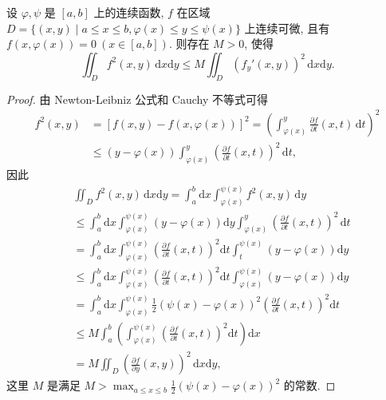 \documentclass[../../main.tex]{subfiles}%
\begin{document}
\begin{theorem}\label{theorem:Poincaré(庞加莱)不等式}
设 \(\varphi, \psi\) 是 \([a,b]\) 上的连续函数, \(f\) 在区域 \(D = \{(x,y) \mid a \leqslant x \leqslant b, \varphi(x) \leqslant y \leqslant \psi(x)\}\) 上连续可微, 且有 \(f(x, \varphi(x)) = 0\ (x \in [a,b])\). 则存在 \(M > 0\), 使得
\[
\iint_D f^2(x,y) \, \mathrm{d}x\mathrm{d}y \leqslant M \iint_D (f_y'(x,y))^2 \, \mathrm{d}x\mathrm{d}y.
\]
\end{theorem}
\begin{proof}

由 Newton-Leibniz 公式和 Cauchy 不等式可得
\begin{align*}
f^2(x,y)&=[f(x,y)-f(x,\varphi (x))]^2=\left( \int_{\varphi (x)}^y{\frac{\partial f}{\partial t}(x,t)\,\mathrm{d}t} \right) ^2
\\
&\leqslant (y-\varphi (x))\int_{\varphi (x)}^y{\left( \frac{\partial f}{\partial t}(x,t) \right) ^2\,\mathrm{d}t},
\end{align*}
因此
\begin{align*}
&\iint_D{f^2\left( x,y \right) \,\mathrm{d}x\mathrm{d}y}=\int_a^b{\mathrm{d}x}\int_{\varphi \left( x \right)}^{\psi \left( x \right)}{f^2\left( x,y \right) \,\mathrm{d}y}
\\
&\leqslant \int_a^b{\mathrm{d}x}\int_{\varphi \left( x \right)}^{\psi \left( x \right)}{\left( y-\varphi \left( x \right) \right) \mathrm{d}y}\int_{\varphi \left( x \right)}^y{\left( \frac{\partial f}{\partial t}\left( x,t \right) \right) ^2\,\mathrm{d}t}
\\
&=\int_a^b{\mathrm{d}x}\int_{\varphi \left( x \right)}^{\psi \left( x \right)}{\left( \frac{\partial f}{\partial t}\left( x,t \right) \right) ^2\mathrm{d}t}\int_t^{\psi \left( x \right)}{\left( y-\varphi \left( x \right) \right) \mathrm{d}y}
\\
&\leqslant \int_a^b{\mathrm{d}x}\int_{\varphi \left( x \right)}^{\psi \left( x \right)}{\left( \frac{\partial f}{\partial t}\left( x,t \right) \right) ^2\mathrm{d}t}\int_{\varphi \left( x \right)}^{\psi \left( x \right)}{\left( y-\varphi \left( x \right) \right) \mathrm{d}y}
\\
&=\int_a^b{\mathrm{d}x}\int_{\varphi \left( x \right)}^{\psi \left( x \right)}{\frac{1}{2}\left( \psi \left( x \right) -\varphi \left( x \right) \right) ^2\left( \frac{\partial f}{\partial t}\left( x,t \right) \right) ^2\mathrm{d}t}
\\
&\leqslant M\int_a^b{\left( \int_{\varphi \left( x \right)}^{\psi \left( x \right)}{\left( \frac{\partial f}{\partial t}\left( x,t \right) \right) ^2\mathrm{d}t} \right) \mathrm{d}x}
\\
&=M\iint_D{\left( \frac{\partial f}{\partial y}\left( x,y \right) \right) ^2\,\mathrm{d}x\mathrm{d}y},
\end{align*}
这里 \(M\) 是满足 \(M > \max_{a \leqslant x \leqslant b} \frac{1}{2} (\psi(x) - \varphi(x))^2\) 的常数.

\end{proof}
\end{document}

